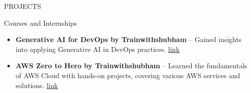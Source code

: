 \documentclass{resume} %
\begin{document}
\begin{rSection}{PROJECTS}
\end{rSection}

\begin{rSection}{Courses and Internships} 
\begin{itemize}
    \item {\bf Generative AI for DevOps by Trainwithshubham} – Gained insights into applying Generative AI in DevOps practices.  {\href{https://www.linkedin.com/posts/kaus-jadhv_90daysofdevops-ai-devops-activity-7174011753121394690-Riad?utm_source=share&utm_medium=member_desktop}{link}}
    \item {\bf AWS Zero to Hero by Trainwithshubham} – Learned the fundamentals of AWS Cloud with hands-on projects, covering various AWS services and solutions. {\href{https://www.linkedin.com/posts/kaus-jadhv_aws-cloudcomputing-devops-activity-7204076699913711616-FyGV?utm_source=share&utm_medium=member_desktop}{link}}
\end{itemize}


\end{rSection}

\end{document}
